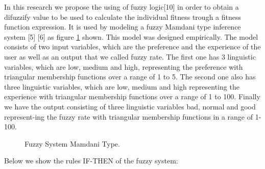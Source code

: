 In this research we propose the using of fuzzy logic[10] in order to obtain a
difuzzify value to be used to calculate the individual fitness trough a fitness
function expression. It is used by modeling a fuzzy Mamdani type inference
system [5] [6] as figure \ref{fig:fis01} shown. This model was designed empirically.
The model consists of two input variables, which are the preference and the
experience of the user as well as an output that we called fuzzy rate. The first
one has 3 linguistic variables, which are low, medium and high, representing the
preference with triangular membership functions over a range of 1 to 5. The
second one also has three linguistic variables, which are low, medium and high
representing the experience with triangular membership functions over a range of
1 to 100. Finally we have the output consisting of three linguistic variables
bad, normal and good represent-ing the fuzzy rate with triangular membership
functions in a range of 1-100.

\begin{figure}
\captionsetup{justification=centering,margin=2cm}
\centering
\setlength\fboxsep{0pt}
\setlength\fboxrule{0.7pt}
\caption{Fuzzy System Mamdani Type.}
\label{fig:fis01}
\end{figure}

Below we show the rules IF-THEN of the fuzzy system:

